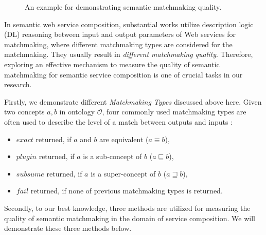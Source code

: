\begin{figure}
\centerline{
}
\caption{An example for demonstrating semantic matchmaking quality.}
\label{fig:sm_example}
\end{figure}

In semantic web service composition, substantial works \cite{bansal2016generalized,lecue2009optimizing, lecue2007making, lecue2006formal, rao2005semantic} utilize description logic (DL) reasoning between input and output parameters of Web services for matchmaking, where different matchmaking types are considered for the matchmaking. They usually result in \emph{different matchmaking quality}. Therefore, exploring an effective mechanism to measure the quality of semantic matchmaking for semantic service composition is one of crucial tasks in our research. 

Firstly, we demonstrate different \emph{Matchmaking Types} discussed above here. Given two concepts $a, b$ in ontology $\mathcal{O}$, four commonly used matchmaking types are often used to describe the level of a match between outputs and inputs \cite{paolucci2002semantic}: 
\begin{itemize}
\item $exact$ returned, if $a$ and $b$ are equivalent ($a \equiv b$), 
\item $plugin$ returned, if $a$ is a sub-concept of $b$ ($a \sqsubseteq b$),
\item $subsume$ returned, if $a$ is a super-concept of $b$ ($a \sqsupseteq b$), 
\item $fail$ returned, if none of previous matchmaking types is returned. 
\end{itemize}

Secondly, to our best knowledge, three methods  \cite{lecue2007making, pop2009immune,shet2012new} are utilized for measuring the quality of semantic matchmaking in the domain of service composition. We will demonstrate these three methods below.

